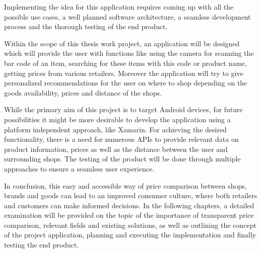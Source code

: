 Implementing the idea for this application requires coming up with all the possible use cases, a well planned  software architecture, a seamless development process and the thorough testing of the end product. 

Within the scope of this thesis work project, an application will be designed which will provide the user with functions like using the camera for scanning the bar code of an item, searching for these items with this code or product name, getting prices from various retailers. Moreover the application will try to give personalized recommendations for the user on where to shop depending on the goods availability, prices and distance of the shops.

While the primary aim of this project is to target Android devices, for future possibilities it might be more desirable to develop the application using a platform independent approach, like Xamarin. For achieving the desired functionality, there is a need for numerous APIs to provide relevant data on product information, prices as well as the distance between the user and surrounding shops. The testing of the product will be done through multiple approaches to ensure a seamless user experience.

In conclusion, this easy and accessible way of price comparison between shops, brands and goods can lead to an improved consumer culture, where both retailers and customers can make informed decisions. In the following chapters, a detailed examination will be provided on the topic of the importance of transparent price comparison, relevant fields and existing solutions, as well as outlining the concept of the project application, planning and executing the implementation and finally testing the end product.



